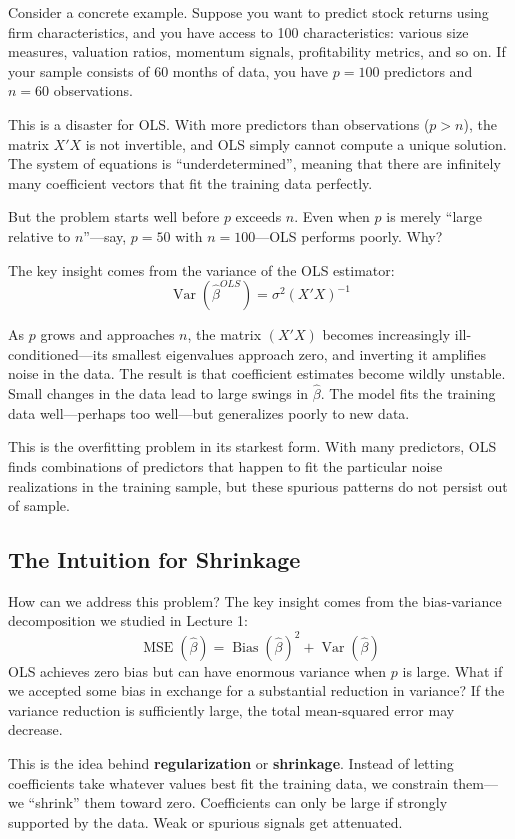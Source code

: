 \documentclass[11pt,a4paper]{article}
\DeclareMathOperator{\Var}{Var}
\DeclareMathOperator{\MSE}{MSE}
\DeclareMathOperator{\Bias}{Bias}
\newcommand{\keyword}[1]{\textbf{\textcolor{AccentOrange}{#1}}}
\begin{document}
Consider a concrete example. Suppose you want to predict stock returns using firm characteristics, and you have access to 100 characteristics: various size measures, valuation ratios, momentum signals, profitability metrics, and so on. If your sample consists of 60 months of data, you have $p = 100$ predictors and $n = 60$ observations.

This is a disaster for OLS. With more predictors than observations ($p > n$), the matrix $X'X$ is not invertible, and OLS simply cannot compute a unique solution. The system of equations is ``underdetermined'', meaning that there are infinitely many coefficient vectors that fit the training data perfectly.

But the problem starts well before $p$ exceeds $n$. Even when $p$ is merely ``large relative to $n$''---say, $p = 50$ with $n = 100$---OLS performs poorly. Why?

The key insight comes from the variance of the OLS estimator:
\[
\Var(\widehat{\beta}^{OLS}) = \sigma^2 (X'X)^{-1}
\]

As $p$ grows and approaches $n$, the matrix $(X'X)$ becomes increasingly ill-conditioned---its smallest eigenvalues approach zero, and inverting it amplifies noise in the data. The result is that coefficient estimates become wildly unstable. Small changes in the data lead to large swings in $\widehat{\beta}$. The model fits the training data well---perhaps too well---but generalizes poorly to new data.

This is the overfitting problem in its starkest form. With many predictors, OLS finds combinations of predictors that happen to fit the particular noise realizations in the training sample, but these spurious patterns do not persist out of sample.

\subsection{The Intuition for Shrinkage}

How can we address this problem? The key insight comes from the bias-variance decomposition we studied in Lecture 1:
\[
\MSE(\widehat{\beta}) = \Bias(\widehat{\beta})^2 + \Var(\widehat{\beta})
\]
OLS achieves zero bias but can have enormous variance when $p$ is large. What if we accepted some bias in exchange for a substantial reduction in variance? If the variance reduction is sufficiently large, the total mean-squared error may decrease.

This is the idea behind \keyword{regularization} or \keyword{shrinkage}. Instead of letting coefficients take whatever values best fit the training data, we constrain them---we ``shrink'' them toward zero. Coefficients can only be large if strongly supported by the data. Weak or spurious signals get attenuated.
\end{document}
